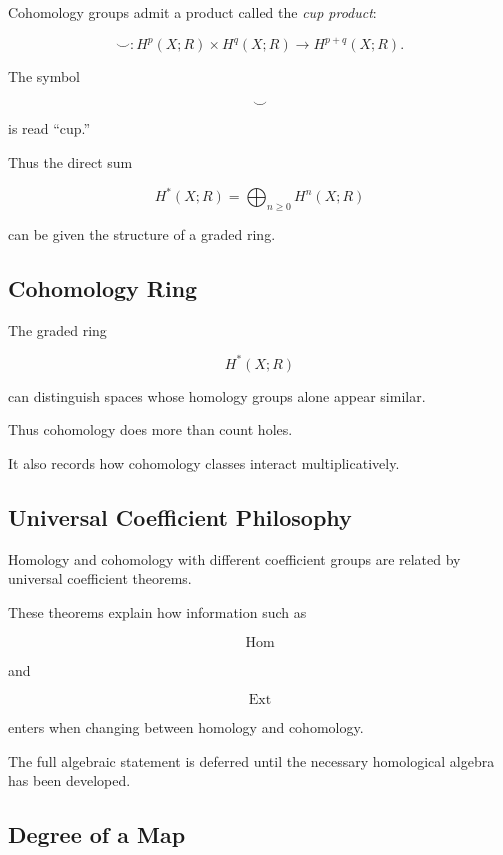 Cohomology groups admit a product called the \emph{cup product}:

\[
\boxed{
\smile:
H^p(X;R)\times H^q(X;R)
\to
H^{p+q}(X;R).
}
\]

The symbol

\[
\smile
\]

is read ``cup.''

Thus the direct sum

\[
\boxed{
H^*(X;R)
=
\bigoplus_{n\geq0}H^n(X;R)
}
\]

can be given the structure of a graded ring.

\subsection{Cohomology Ring}
\label{subsec:cohomology-ring}

The graded ring

\[
\boxed{
H^*(X;R)
}
\]

can distinguish spaces whose homology groups alone appear similar.

Thus cohomology does more than count holes.

It also records how cohomology classes interact multiplicatively.

\subsection{Universal Coefficient Philosophy}
\label{subsec:universal-coefficient-philosophy}

Homology and cohomology with different coefficient groups are related by
universal coefficient theorems.

These theorems explain how information such as

\[
\operatorname{Hom}
\]

and

\[
\operatorname{Ext}
\]

enters when changing between homology and cohomology.

The full algebraic statement is deferred until the necessary homological
algebra has been developed.

\subsection{Degree of a Map}
\label{subsec:degree-of-map}

